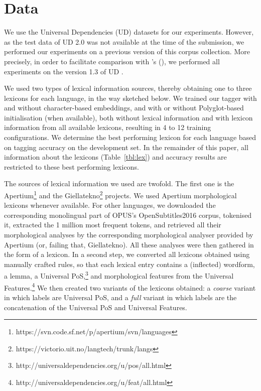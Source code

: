 \documentclass[11pt,a4paper]{article}
\newcommand\hm[1]{\textcolor{blue}{#1}}
\newcommand\bs[1]{\textcolor{red}{#1}}
\newcommand\discussion[1]{}
\begin{document}

\section{Data}

\discussion{\hm{\textbf{HM if space is an issue we can do away with the explaination on why not 2.0 and just say were
      repliacate Plank16}}\bs{\textbf{We don't need to reduce that much I think}}} We use the Universal Dependencies
(UD) datasets for our experiments. However, as the test data of UD 2.0 was not available at the time of the submission,
we performed our experiments on a previous version of this corpus collection. More precisely, in order to facilitate
comparison with \citeauthor{plank16}'s (\citeyear{plank16}), we performed all experiments on the version 1.3 of UD
\cite{ud13}.

We used two types of lexical information sources, thereby obtaining one to three lexicons for each language, in the way
sketched below. We trained our tagger with and without character-based embeddings, and with or without Polyglot-based
initialisation (when available), both without lexical information and with lexicon information from all available
lexicons, resulting in 4 to 12 training configurations. We determine the best performing lexicon for each language based
on tagging accuracy on the development set. In the remainder of this paper, all information about the lexicons
(Table~\ref{tbl:lex}) and accuracy results are restricted to these best performing lexicons.

The sources of lexical information we used are twofold. The first one is the
Apertium\footnote{https://svn.code.sf.net/p/apertium/svn/languages} and the
Giellatekno\footnote{https://victorio.uit.no/langtech/trunk/langs} projects. We used Apertium morphological lexicons
whenever available. For other languages, we downloaded the corresponding monolingual part of OPUS's OpenSubtitles2016
corpus, tokenised it, extracted the 1 million most frequent tokens, and retrieved all their morphological analyses by
the corresponding morphological analyser provided by Apertium (or, failing that, Giellatekno). All these analyses were
then gathered in the form of a lexicon. In a second step, we converted all lexicons obtained using manually crafted
rules, so that each lexical entry contains a (inflected) wordform, a lemma, a Universal
PoS,\footnote{http://universaldependencies.org/u/pos/all.html} and morphological features from the Universal
Features.\footnote{http://universaldependencies.org/u/feat/all.html} We then created two variants of the lexicons
obtained: a {\em coarse} variant in which labels are Universal PoS, and a {\em full} variant in which labels are the
concatenation of the Universal PoS and Universal Features.
\end{document}
